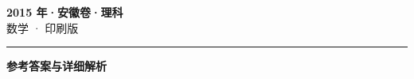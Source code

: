 \documentclass[zihao=5, a4paper]{ctexart}
\begin{document}
\begin{center}
  {\Large\bfseries 2015 年·安徽卷·理科}\\[4pt]
  {\large 数学 · 印刷版}
\end{center}
\medskip
{}

\par\bigskip\hrule\bigskip
{}
\begin{center}{\large\bfseries 参考答案与详细解析}\end{center}
\smallskip

\end{document}
